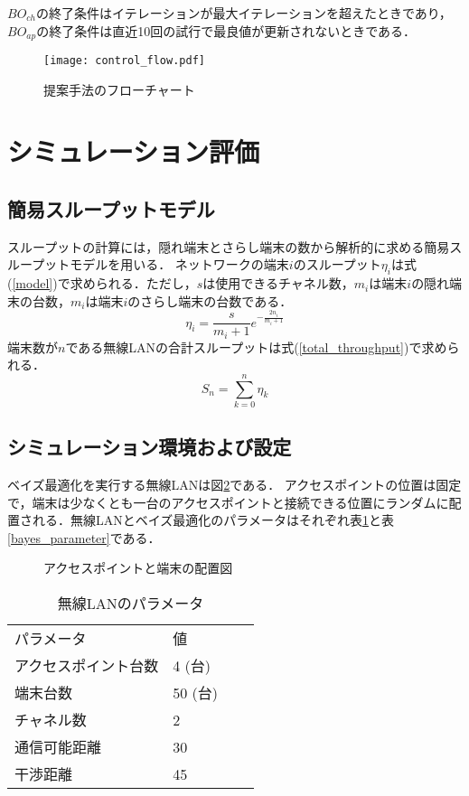\documentclass[a4paper,11pt]{jarticle}
\begin{document}
$BO_{ch}$の終了条件はイテレーションが最大イテレーションを超えたときであり，$BO_{ap}$の終了条件は直近10回の試行で最良値が更新されないときである．

\begin{figure}[t]
  \centering
  \texttt{[image: control\_flow.pdf]}
  \caption{提案手法のフローチャート}
  \label{control_flow}
\end{figure}

\section{シミュレーション評価}

\subsection{簡易スループットモデル}
スループットの計算には，隠れ端末とさらし端末の数から解析的に求める簡易スループットモデル\cite{Wu2000}を用いる．
ネットワークの端末$i$のスループット$\eta_i$は式(\ref{model})で求められる．ただし，$s$は使用できるチャネル数，$m_i$は端末$i$の隠れ端末の台数，$m_i$は端末$i$のさらし端末の台数である．
\begin{equation}
  \eta_i=\frac{s}{m_i+1}e^{-\frac{2n_i}{m_i+1}} \label{model}
\end{equation}
端末数が$n$である無線LANの合計スループットは式(\ref{total_throughput})で求められる．
\begin{equation}
  S_n=\sum_{k=0}^{n}\eta_k \label{total_throughput}
\end{equation}

\subsection{シミュレーション環境および設定}
ベイズ最適化を実行する無線LANは図\ref{position}である．
アクセスポイントの位置は固定で，端末は少なくとも一台のアクセスポイントと接続できる位置にランダムに配置される．無線LANとベイズ最適化のパラメータはそれぞれ表\ref{network_parameter}と表\ref{bayes_parameter}である．

\begin{figure}[t]
  \centering
  
  \caption{アクセスポイントと端末の配置図}
  \label{position}
\end{figure}

\begin{table}[H]
\centering
\caption{無線LANのパラメータ}
\begin{tabular}{l|lll}
パラメータ & 値 &  &  \\ \cline{1-2}
アクセスポイント台数 & 4 (台)  &  &  \\
端末台数 & 50 (台) &  &  \\
チャネル数 & 2 &  &  \\
通信可能距離  & 30 &  &  \\
干渉距離 & 45 &  &  \\
\end{tabular}
\label{network_parameter}
\end{table}
\end{document}
